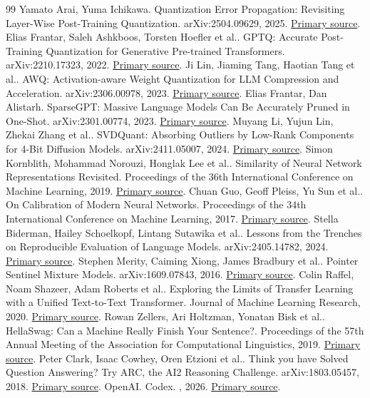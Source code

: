 \documentclass[10pt,a4paper,twocolumn]{article}
\begin{document}
\begin{thebibliography}{99}
 Yamato Arai, Yuma Ichikawa. Quantization Error Propagation: Revisiting Layer-Wise Post-Training Quantization. arXiv:2504.09629, 2025. \href{https://arxiv.org/abs/2504.09629}{Primary source}.
 Elias Frantar, Saleh Ashkboos, Torsten Hoefler et al.. GPTQ: Accurate Post-Training Quantization for Generative Pre-trained Transformers. arXiv:2210.17323, 2022. \href{https://arxiv.org/abs/2210.17323}{Primary source}.
 Ji Lin, Jiaming Tang, Haotian Tang et al.. AWQ: Activation-aware Weight Quantization for LLM Compression and Acceleration. arXiv:2306.00978, 2023. \href{https://arxiv.org/abs/2306.00978}{Primary source}.
 Elias Frantar, Dan Alistarh. SparseGPT: Massive Language Models Can Be Accurately Pruned in One-Shot. arXiv:2301.00774, 2023. \href{https://arxiv.org/abs/2301.00774}{Primary source}.
 Muyang Li, Yujun Lin, Zhekai Zhang et al.. SVDQuant: Absorbing Outliers by Low-Rank Components for 4-Bit Diffusion Models. arXiv:2411.05007, 2024. \href{https://arxiv.org/abs/2411.05007}{Primary source}.
 Simon Kornblith, Mohammad Norouzi, Honglak Lee et al.. Similarity of Neural Network Representations Revisited. Proceedings of the 36th International Conference on Machine Learning, 2019. \href{https://proceedings.mlr.press/v97/kornblith19a.html}{Primary source}.
 Chuan Guo, Geoff Pleiss, Yu Sun et al.. On Calibration of Modern Neural Networks. Proceedings of the 34th International Conference on Machine Learning, 2017. \href{https://proceedings.mlr.press/v70/guo17a.html}{Primary source}.
 Stella Biderman, Hailey Schoelkopf, Lintang Sutawika et al.. Lessons from the Trenches on Reproducible Evaluation of Language Models. arXiv:2405.14782, 2024. \href{https://arxiv.org/abs/2405.14782}{Primary source}.
 Stephen Merity, Caiming Xiong, James Bradbury et al.. Pointer Sentinel Mixture Models. arXiv:1609.07843, 2016. \href{https://arxiv.org/abs/1609.07843}{Primary source}.
 Colin Raffel, Noam Shazeer, Adam Roberts et al.. Exploring the Limits of Transfer Learning with a Unified Text-to-Text Transformer. Journal of Machine Learning Research, 2020. \href{https://jmlr.org/papers/v21/20-074.html}{Primary source}.
 Rowan Zellers, Ari Holtzman, Yonatan Bisk et al.. HellaSwag: Can a Machine Really Finish Your Sentence?. Proceedings of the 57th Annual Meeting of the Association for Computational Linguistics, 2019. \href{https://aclanthology.org/P19-1472/}{Primary source}.
 Peter Clark, Isaac Cowhey, Oren Etzioni et al.. Think you have Solved Question Answering? Try ARC, the AI2 Reasoning Challenge. arXiv:1803.05457, 2018. \href{https://arxiv.org/abs/1803.05457}{Primary source}.
 OpenAI. Codex. , 2026. \href{https://openai.com/codex/}{Primary source}.
\end{thebibliography}
\end{document}
